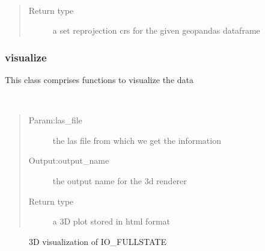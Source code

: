 \documentclass[letterpaper,10pt,english]{sphinxmanual}
\begin{document}
\begin{fulllineitems}
~\begin{quote}\begin{description}
\item[{Return type}] \leavevmode
\sphinxAtStartPar
a set reprojection crs for the given geopandas dataframe

\end{description}\end{quote}

\end{fulllineitems}



\subsubsection{visualize}
\label{\detokenize{tutorial:visualize}}
\sphinxAtStartPar
This class comprises functions to visualize the data


\begin{fulllineitems}
~\begin{quote}\begin{description}
\item[{Param:las\_file}] \leavevmode
\sphinxAtStartPar
the las file from which we get the information

\item[{Output:output\_name}] \leavevmode
\sphinxAtStartPar
the output name for the 3d renderer

\item[{Return type}] \leavevmode
\sphinxAtStartPar
a 3D plot stored in html format

\end{description}\end{quote}

\begin{figure}[htbp]
\centering
\capstart

\noindent{}
\caption{3D visualization of IO\_FULLSTATE}\label{\detokenize{tutorial:id1}}\end{figure}

\end{fulllineitems}

\end{document}
